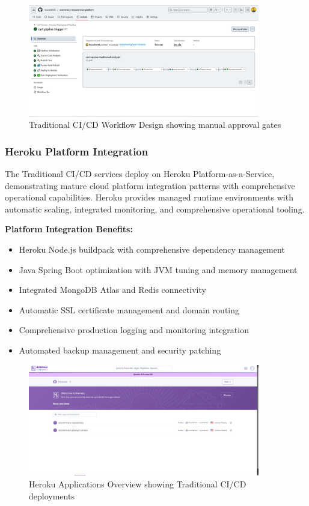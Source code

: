 \begin{figure}[H]
\centering
\includegraphics[width=0.9\textwidth]{figures/chapter4/traditional-cicd-workflow-design.png}
\caption{Traditional CI/CD Workflow Design showing manual approval gates}
\label{fig:traditional-cicd-workflow-design}
\end{figure}

\subsubsection{Heroku Platform Integration}

The Traditional CI/CD services deploy on Heroku Platform-as-a-Service, demonstrating mature cloud platform integration patterns with comprehensive operational capabilities. Heroku provides managed runtime environments with automatic scaling, integrated monitoring, and comprehensive operational tooling.

\textbf{Platform Integration Benefits:}
\begin{itemize}
\item Heroku Node.js buildpack with comprehensive dependency management
\item Java Spring Boot optimization with JVM tuning and memory management
\item Integrated MongoDB Atlas and Redis connectivity
\item Automatic SSL certificate management and domain routing
\item Comprehensive production logging and monitoring integration
\item Automated backup management and security patching
\end{itemize}

\begin{figure}[H]
\centering
\includegraphics[width=0.9\textwidth]{figures/chapter4/heroku-apps-overview.png}
\caption{Heroku Applications Overview showing Traditional CI/CD deployments}
\label{fig:heroku-apps-overview}
\end{figure}

